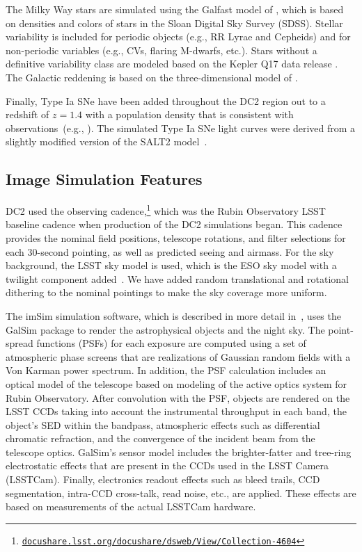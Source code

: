 \documentclass[modern]{descnote}
\newcommand*{\https}[1]{\href{https://#1}{\nolinkurl{#1}}}
\begin{document}
The Milky Way stars are simulated using the Galfast model of \citet{2008ApJ...673..864J}, which is based on densities and colors of stars in the Sloan Digital Sky Survey (SDSS). Stellar variability is included for periodic objects (e.g., RR Lyrae and Cepheids) and for non-periodic variables (e.g., CVs, flaring M-dwarfs, etc.).  Stars without a definitive variability class are modeled based on the Kepler Q17 data release \citep{2016ksci.rept....3T}.  The Galactic reddening is based on the three-dimensional model of \cite{2005AJ....130..659A}.

Finally, Type Ia SNe have been added throughout the DC2 region out to a redshift of $z=1.4$ with a population density that is consistent with observations~(e.g., \citealt{2010ApJ...713.1026D}). The simulated Type Ia SNe light curves were derived from a slightly modified version of the SALT2 model~\citep{2007A&A...466...11G}.

\subsection{Image Simulation Features}

DC2 used the  observing cadence,\footnote{ \https{docushare.lsst.org/docushare/dsweb/View/Collection-4604}} which was the Rubin Observatory LSST baseline cadence when production of the DC2 simulations began. This cadence provides the nominal field positions, telescope rotations, and filter selections for each 30-second pointing, as well as predicted seeing and airmass.  For the sky background, the LSST sky model is used, which is the ESO sky model with a twilight component added~\citep{2016SPIE.9910E..1AY}.  We have added random translational and rotational dithering to the nominal pointings to make the sky coverage more uniform.

The imSim simulation software, which is described in more detail in~\cite{2020arXiv201005926L}, uses the GalSim package \citep{2015A&C....10..121R} to render the astrophysical objects and the night sky.  The point-spread functions (PSFs) for each exposure are computed using a set of atmospheric phase screens that are realizations of Gaussian random fields with a Von Karman power spectrum.  In addition, the PSF calculation includes an optical model of the telescope based on modeling of the active optics system for Rubin Observatory.  After convolution with the PSF, objects are rendered on the LSST CCDs taking into account the instrumental throughput in each band, the object's SED within the bandpass, atmospheric effects such as differential chromatic refraction, and the convergence of the incident beam from the telescope optics. GalSim's sensor model includes the brighter-fatter and tree-ring electrostatic effects that are present in the CCDs used in the LSST Camera (LSSTCam).  Finally, electronics readout effects such as bleed trails, CCD segmentation, intra-CCD cross-talk, read noise, etc., are applied.  These effects are based on measurements of the actual LSSTCam hardware.
\end{document}
